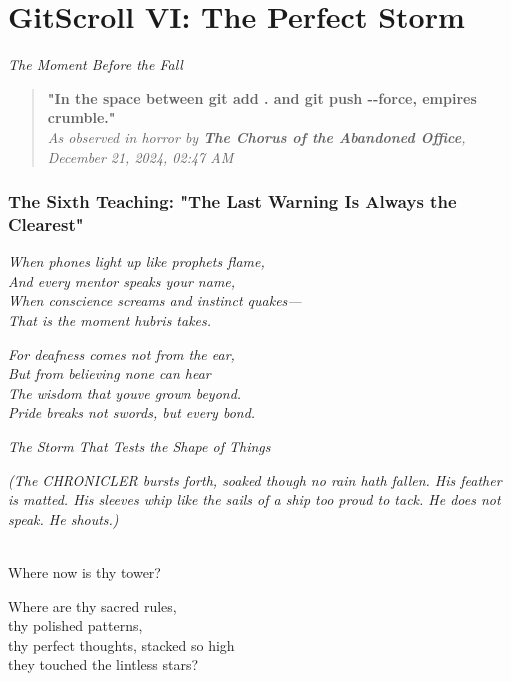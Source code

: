 \chapter{GitScroll VI: The Perfect Storm}
\label{chap:06-The-Perfect-Storm}

\emph{The Moment Before the Fall}

\begin{quote}
\textbf{"In the space between \textquotesingle git add .\textquotesingle{} and \textquotesingle git push -\/-force\textquotesingle, empires crumble."}\\
\emph{As observed in horror by \textbf{The Chorus of the Abandoned Office}, December 21, 2024, 02:47 AM}
\end{quote}

\subsection{The Sixth Teaching: "The Last Warning Is Always the Clearest"}\label{the-sixth-teaching-the-last-warning-is-always-the-clearest}

\emph{When phones light up like prophet\textquotesingle s flame,}\\
\emph{And every mentor speaks your name,}\\
\emph{When conscience screams and instinct quakes---}\\
\emph{That is the moment hubris takes.}

\emph{For deafness comes not from the ear,}\\
\emph{But from believing none can hear}\\
\emph{The wisdom that you\textquotesingle ve grown beyond.}\\
\emph{Pride breaks not swords, but every bond.}

\bookdivider

\label{performing_arts-invocation-before-the-scroll}

\emph{The Storm That Tests the Shape of Things}

\emph{(The CHRONICLER bursts forth, soaked though no rain hath fallen. His feather is matted. His sleeves whip like the sails of a ship too proud to tack. He does not speak. He shouts.)}

\\
Where now is thy tower?

Where are thy sacred rules,\\
thy polished patterns,\\
thy perfect thoughts, stacked so high\\
they touched the lintless stars?

